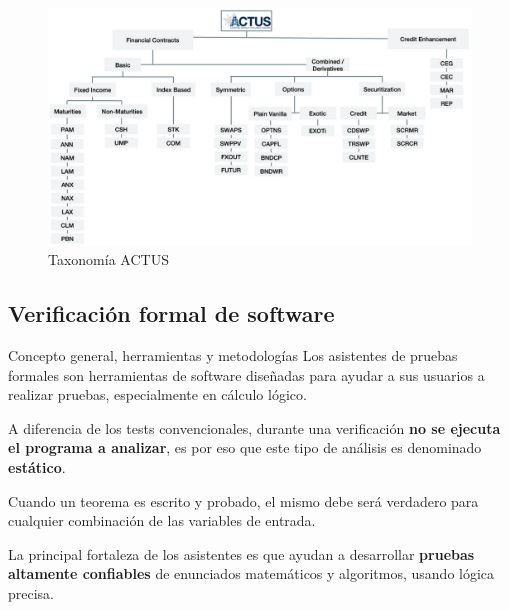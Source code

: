 \documentclass{beamer}
\begin{document}
\begin{frame}[fragile]
\begin{figure}[H]
    \centering
    \includegraphics[width=\textwidth]{ACTUS_Taxonomy.png}
    \caption{Taxonomía ACTUS}
\end{figure}

\end{frame}



\subsection{Verificación formal de software}

\begin{frame}{Concepto general, herramientas y metodologías}
Los asistentes de pruebas formales son herramientas de software diseñadas para ayudar a sus usuarios a realizar pruebas, especialmente en cálculo lógico.

\vfill
\pause

A diferencia de los tests convencionales, durante una verificación \textbf{no se ejecuta el programa a analizar}, es por eso que este tipo de análisis es denominado \textbf{estático}.

\vfill

Cuando un teorema es escrito y probado, el mismo debe será verdadero para cualquier combinación de las variables de entrada.

\vfill
\pause

La principal fortaleza de los asistentes es que ayudan a desarrollar \textbf{pruebas altamente confiables} de enunciados matemáticos y algoritmos, usando lógica precisa.
\end{frame}
\end{document}
